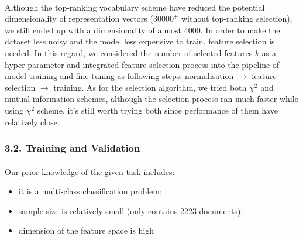 \documentclass{article}
\begin{document}
\paragraph{}
Although the top-ranking vocabulary scheme have reduced the potential dimensionality of representation vectors ($30000^+$ without top-ranking selection), we still ended up with a dimensionality of almost 4000. In order to make the dataset less noisy and the model less expensive to train, feature selection is needed. In this regard, we considered the number of selected features $k$ as a hyper-parameter and integrated feature selection process into the pipeline of model training and fine-tuning as following steps: normalisation $\rightarrow$ feature selection $\rightarrow$ training. As for the selection algorithm, we tried both $\chi ^2$ and mutual information schemes, although the selection process ran much faster while using $\chi ^2$ scheme, it's still worth trying both since performance of them have relatively close\cite{3}.
\subsubsection*{3.2. Training and Validation}
\paragraph{}
Our prior knowledge of the given task includes: 
\begin{itemize}
	\item it is a multi-class classification problem; 
	\item sample size is relatively small (only contains 2223 documents); 
	\item dimension of the feature space is high
\end{itemize}
\end{document}
